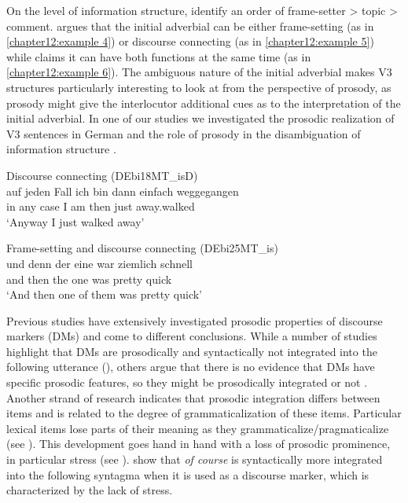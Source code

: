 \documentclass[output=paper,colorlinks,citecolor=brown]{langscibook}
\begin{document}
On the level of information structure, \citet{Wiese_Rehbein_2016} identify an order of frame-setter > topic > comment. \citet{Schalowski_2017} argues that the initial adverbial can be either frame-setting (as in \ref{chapter12:example 4}) or discourse connecting (as in \ref{chapter12:example 5}) while \citet{Bunk_2020} claims it can have both functions at the same time (as in \ref{chapter12:example 6}). The ambiguous nature of the initial adverbial makes V3 structures particularly interesting to look at from the perspective of prosody, as prosody might give the interlocutor additional cues as to the interpretation of the initial adverbial. In one of our studies we investigated the prosodic realization of V3 sentences in German and the role of prosody in the disambiguation of information structure \citep{Bunk_Rocker_inprep}.

\begin{exe}
  \ex Discourse connecting (DEbi18MT\_isD)\\\label{chapter12:example 5}
      \gll auf jeden Fall ich bin dann einfach weggegangen\\
      in any case I am then just away.walked \\
      \glt `Anyway I just walked away'


    \ex Frame-setting and discourse connecting (DEbi25MT\_is)\\\label{chapter12:example 6}
        \gll und denn der eine war ziemlich schnell\\
        and then the one was pretty quick \\
        \glt `And then one of them was pretty quick'
\end{exe}

Previous studies have extensively investigated prosodic properties of discourse markers (DMs) and come to different conclusions. While a number of studies highlight that DMs are prosodically and syntactically not integrated into the following utterance (\cite{Jucker_Ziv_1998, Auer_Günthner_2005, Brinton_2010}), others argue that there is no evidence that DMs have specific prosodic features, so they might be prosodically integrated or not \citep{Imo_2012}. Another strand of research indicates that prosodic integration differs between items and is related to the degree of grammaticalization of these items. Particular lexical items lose parts of their meaning as they grammaticalize\slash pragmaticalize (see \cite{Traugott_1995, Auer_Günthner_2005}). This development goes hand in hand with a loss of prosodic prominence, in particular stress (see \cite{Bybee_Pagliuca_Perkins_1991, Hirschberg_Litman_1993, Wichmann_2011, Dehé_Stathi_2016}). \citet{Wichmann_Simon-Vandenbergen_Aijmer_2010} show that \textit{of course} is syntactically more integrated into the following syntagma when it is used as a discourse marker, which is characterized by the lack of stress.
\end{document}
